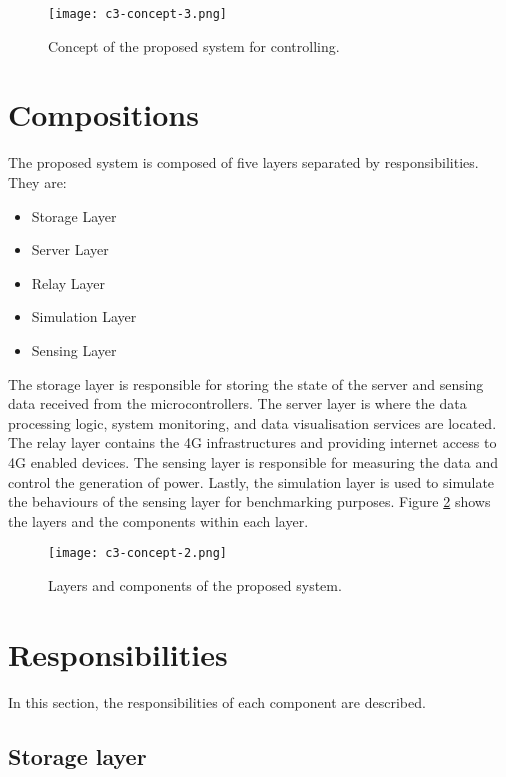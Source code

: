 \documentclass[../thesis.tex]{subfiles}
\begin{document}
\begin{figure}[!ht]
  \texttt{[image: c3-concept-3.png]}
  \caption{Concept of the proposed system for controlling.}
  \label{fig:concept3}
\end{figure}


\newpage
\section{Compositions}


The proposed system is composed of five layers separated by responsibilities. They are:

\begin{itemize}
	\item Storage Layer
	\item Server Layer
	\item Relay Layer
	\item Simulation Layer
	\item Sensing Layer
\end{itemize}

The storage layer is responsible for storing the state of the server and sensing data received from the microcontrollers. The server layer is where the data processing logic, system monitoring, and data visualisation services are located. The relay layer contains the 4G infrastructures and providing internet access to 4G enabled devices. The sensing layer is responsible for measuring the data and control the generation of power. Lastly, the simulation layer is used to simulate the behaviours of the sensing layer for benchmarking purposes. Figure \ref{fig:concept2} shows the layers and the components within each layer.


\begin{figure}[!ht]
  \texttt{[image: c3-concept-2.png]}
  \caption{Layers and components of the proposed system.}
  \label{fig:concept2}
\end{figure}

\section{Responsibilities}
\label{sec:responsibilities}

In this section, the responsibilities of each component are described. 

\subsection{Storage layer}
\end{document}
